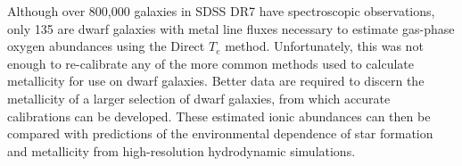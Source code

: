 Although over 800,000 galaxies in SDSS DR7 have spectroscopic observations, only 
135 are dwarf galaxies with metal line fluxes necessary to estimate gas-phase 
oxygen abundances using the Direct $T_e$ method.  Unfortunately, this was not 
enough to re-calibrate any of the more common methods used to calculate 
metallicity for use on dwarf galaxies.  Better data are required to discern the 
metallicity of a larger selection of dwarf galaxies, from which accurate 
calibrations can be developed.  These estimated ionic abundances can then be 
compared with predictions of the environmental dependence of star formation and 
metallicity from high-resolution hydrodynamic simulations.
